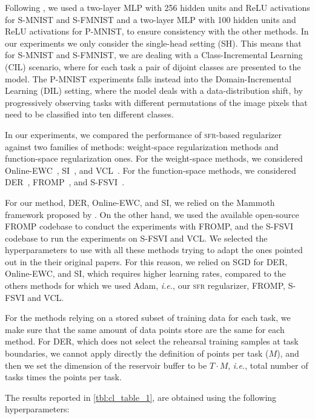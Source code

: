\documentclass{article}
\makeatletter
\newcommand{\ie}{\textit{i.e.\@}\xspace}
\newcommand{\our}{\textsc{sfr}\xspace}
\makeatother
\begin{document}
Following \cite{pan2020continual, rudner2022continual}, we used a two-layer MLP with 256 hidden units and ReLU activations for S-MNIST and S-FMNIST and a two-layer MLP with 100 hidden units and ReLU activations for P-MNIST, to ensure consistency with the other methods. In our experiments we only consider the single-head setting (SH). This means that for S-MNIST and S-FMNIST, we are dealing with a Class-Incremental Learning (CIL) scenario, where for each task a pair of dijoint classes are presented to the model. The P-MNIST experiments falls instead into the Domain-Incremental Learning (DIL) setting, where the model deals with a data-distribution shift, by progressively observing tasks with different permutations of the image pixels that need to be classified into ten different classes.

In our experiments, we compared the performance of \our-based regularizer against two families of methods: weight-space regularization methods and function-space regularization ones.
For the weight-space methods, we considered Online-EWC~\citep{schwarz2018progress}, SI~\citep{zenke2017continual}, and VCL~\citep{nguyen2018variational}.  %
For the function-space methods, we considered DER~\citep{buzzega2020dark}, FROMP~\citep{pan2020continual}, and S-FSVI~\citep{rudner2022continual}.

For our method, DER, Online-EWC, and SI, we relied on the Mammoth framework proposed by \citep{buzzega2020dark}. On the other hand, we used the available open-source FROMP codebase to conduct the experiments with FROMP, and the S-FSVI codebase to run the experiments on S-FSVI and VCL. We selected the hyperparameters to use with all these methods trying to adapt the ones pointed out in the their original papers. For this reason, we relied on SGD for DER, Online-EWC, and SI, which requires higher learning rates, compared to the others methods for which we used Adam, \ie, our \our regularizer, FROMP, S-FSVI and VCL.

For the methods relying on a stored subset of training data for each task, we make sure that the same amount of data points store are the same for each method. For DER, which does not select the rehearsal training samples at task boundaries, we cannot apply directly the definition of points per task ($M$), and then we set the dimension of the reservoir buffer to be $T \cdot M$, \ie, total number of tasks times the points per task.

The results reported in \cref{tbl:cl_table_1}, are obtained using the following hyperparameters:
 
\end{document}
